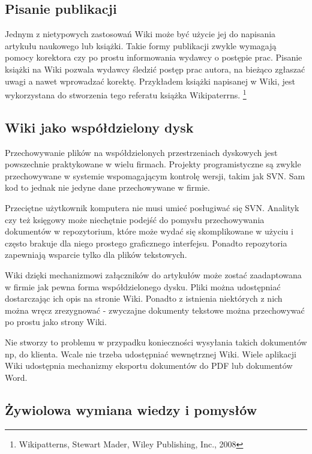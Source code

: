 \documentclass{article}
\begin{document}
	\subsection{Pisanie publikacji}

		Jednym z nietypowych zastosowań Wiki może być użycie jej do napisania artykułu naukowego lub książki. Takie formy publikacji zwykle wymagają pomocy korektora czy po prostu informowania wydawcy o postępie prac. Pisanie książki na Wiki pozwala wydawcy śledzić postęp prac autora, na bieżąco zgłaszać uwagi a nawet wprowadzać korektę. Przykładem książki napisanej w Wiki, jest wykorzystana  do stworzenia tego referatu książka Wikipaterrns. \footnote{Wikipatterns, Stewart Mader, Wiley Publishing, Inc., 2008}


	\subsection{Wiki jako współdzielony dysk}
		Przechowywanie plików na współdzielonych przestrzeniach dyskowych jest powszechnie praktykowane w wielu firmach. Projekty programistyczne są zwykle przechowywane w systemie wspomagającym kontrolę wersji, takim jak SVN. Sam kod to jednak nie jedyne dane przechowywane w firmie. 

		Przeciętne użytkownik komputera nie musi umieć posługiwać się SVN. Analityk czy też księgowy może niechętnie podejść do pomysłu przechowywania dokumentów w repozytorium, które może wydać się skomplikowane w użyciu i często brakuje dla niego prostego graficznego interfejsu. Ponadto repozytoria zapewniają wsparcie tylko dla plików tekstowych. 

		Wiki dzięki mechanizmowi załączników do artykułów może zostać zaadaptowana w firmie jak pewna forma współdzielonego dysku. Pliki można udostępniać dostarczając ich opis na stronie Wiki. Ponadto z istnienia niektórych z nich można wręcz zrezygnować - zwyczajne dokumenty tekstowe można przechowywać po prostu jako strony Wiki.

		Nie stworzy to problemu w przypadku konieczności wysyłania takich dokumentów np, do klienta. Wcale nie trzeba udostępniać wewnętrznej Wiki. Wiele aplikacji Wiki udostępnia mechanizmy eksportu dokumentów do PDF lub dokumentów Word.

	\subsection{Żywiolowa wymiana wiedzy i pomysłów}
\end{document}

